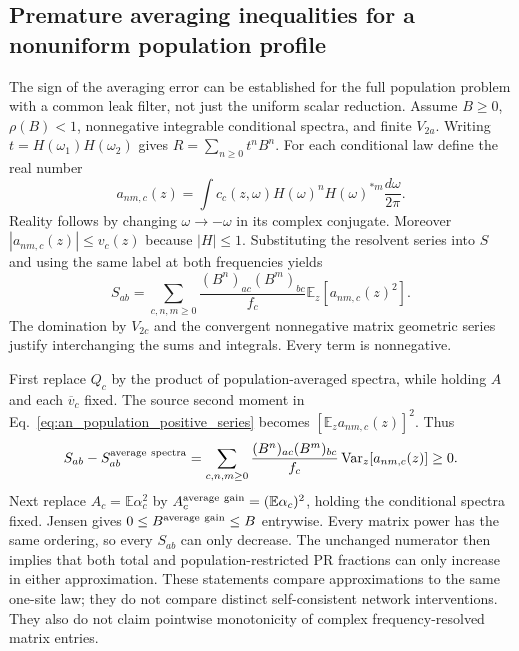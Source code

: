 \subsection{Premature averaging inequalities for a nonuniform population profile}
\label{app:population_averaging_inequalities}

The sign of the averaging error can be established for the full population
problem with a common leak filter, not just the uniform scalar reduction.
Assume $B\geq0$, $\rho(B)<1$, nonnegative integrable conditional spectra,
and finite $V_{2a}$. Writing $t=H(\omega_1)H(\omega_2)$ gives
$R=\sum_{n\geq0}t^nB^n$. For each conditional law define the real number
\begin{equation}
 a_{nm,c}(z)=\int c_c(z,\omega)H(\omega)^nH(\omega)^{*m}
                   \frac{d\omega}{2\pi}.
 \label{eq:an_real_moment}
\end{equation}
Reality follows by changing $\omega\to-\omega$ in its complex conjugate.
Moreover $|a_{nm,c}(z)|\leq v_c(z)$ because $|H|\leq1$.
Substituting the resolvent series into $S$ and using the same label at both
frequencies yields
\begin{equation}
 \boxed{S_{ab}=\sum_{c,n,m\geq0}
   \frac{(B^n)_{ac}(B^m)_{bc}}{f_c}
          \mathbb E_z[a_{nm,c}(z)^2].}
 \label{eq:an_population_positive_series}
\end{equation}
The domination by $V_{2c}$ and the convergent nonnegative matrix geometric
series justify interchanging the sums and integrals. Every term is
nonnegative.

First replace $Q_c$ by the product of population-averaged spectra, while
holding $A$ and each $\overline v_c$ fixed. The source second moment in
Eq.~\eqref{eq:an_population_positive_series} becomes
$[\mathbb E_z a_{nm,c}(z)]^2$. Thus
\begin{equation}
 S_{ab}-S_{ab}^{\rm average\ spectra}
 =\sum_{c,n,m\geq0}\frac{(B^n)_{ac}(B^m)_{bc}}{f_c}
                 \operatorname{Var}_z[a_{nm,c}(z)]\geq0.
 \label{eq:an_Q_inequality}
\end{equation}
Next replace $A_c=\mathbb E\alpha_c^2$ by
$A_c^{\rm average\ gain}=(\mathbb E\alpha_c)^2$, holding the conditional
spectra fixed. Jensen gives $0\leq B^{\rm average\ gain}\leq B$
entrywise. Every matrix power has the same ordering, so every $S_{ab}$
can only decrease. The unchanged numerator then implies that both total and
population-restricted PR fractions can only increase in either approximation.
These statements compare approximations to the same one-site law; they do
not compare distinct self-consistent network interventions. They also do not
claim pointwise monotonicity of complex frequency-resolved matrix entries.

